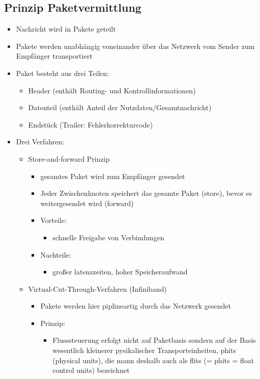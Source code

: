 \subsection{Prinzip Paketvermittlung}
\begin{itemize}
	\item Nachricht wird in Pakete geteilt
	\item Pakete werden unabhängig voneinander über das Netzwerk vom Sender zum Empfänger transportiert
	\item Paket besteht aus drei Teilen:\\
	\begin{itemize}
		\item Header (enthält Routing- und Kontrollinformationen)
		\item Datenteil (enthält Anteil der Nutzdaten/Gesamtnachricht)
		\item Endstück (Trailer: Fehlerkorrekturcode)
	\end{itemize}
	\item Drei Verfahren:
	\begin{itemize}
		\item Store-and-forward Prinzip
		\begin{itemize}
			\item gesamtes Paket wird zum Empfänger gesendet
			\item Jeder Zwischenknoten speichert das gesamte Paket (store), bevor es weitergesendet wird (forward)
			\item Vorteile:
			\begin{itemize}
				\item schnelle Freigabe von Verbindungen
			\end{itemize}
			\item Nachteile:
			\begin{itemize}
				\item großer latenzzeiten, hoher Speicheraufwand
			\end{itemize}
		\end{itemize}
		\item Virtual-Cut-Through-Verfahren (Infiniband)
		\begin{itemize}
			\item Pakete werden hier piplineartig durch das Netzwerk gesendet
			\item Prinzip:
			\begin{itemize}
				\item Flusssteuerung erfolgt nicht auf Paketbasis sondern auf der Basis wesentlich kleinerer pysikalischer Transporteinheiten, phits (physical units), die mann deshalb auch als flits (= phits = float control units) bezeichnet

\end{itemize}
\end{itemize}
\end{itemize}
\end{itemize}
